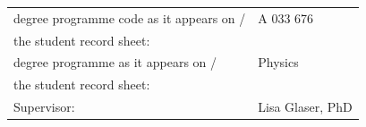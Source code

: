\begin{titlepage}
\begin{center}
\begin{tabular}{p{9cm}p{11.25cm}}
        \fontsize{10}{0} \selectfont degree programme code as it appears on / &
        \fontsize{10}{0} \selectfont A 033 676 \\

        \fontsize{10}{0} \selectfont the student record sheet:\vspace*{0.4cm} &
        \fontsize{10}{0} \selectfont\\

        \fontsize{10}{0} \selectfont degree
        programme as it appears on / &  \fontsize{10}{0} \selectfont Physics \\

        \fontsize{10}{0} \selectfont the student record sheet:\vspace*{0.3cm} &
        \fontsize{10}{0} \selectfont \\

        \fontsize{10}{0} \selectfont
        Supervisor:\vspace*{0.3cm}& \fontsize{10}{0} \selectfont Lisa Glaser, PhD\\
\end{tabular}
\end{center}
\end{titlepage}
